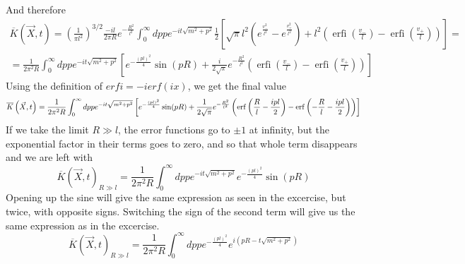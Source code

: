 \documentclass{article}
\DeclareMathOperator{\erfi}{erfi}
\begin{document}
And therefore
\begin{equation}
\begin{gathered}
    \overline{K}\left(\vec{X}, t\right)
    = \left(\frac{1}{\pi l^2}\right)^{3/2} \frac{-il}{2\pi R}
    e^{-\frac{R^2}{l^2}}
    \int_{0}^{\infty} dp p e^{-it\sqrt{m^2 + p^2}}
    \frac{1}{2}\left[
        \sqrt{\pi}l^2\left(e^\frac{v_{-}^2}{l^2} - e^\frac{v_{+}^2}{l^2}\right) +
        l^2 \left(\erfi\left(\frac{v_{-}}{l}\right) - \erfi\left(\frac{v_{+}}{l}\right)\right)
    \right] = \\
    = \frac{1}{2\pi^2 R}
    \int_{0}^{\infty} dp p e^{-it\sqrt{m^2 + p^2}}
    \left[
        e^{-\frac{(pl)^2}{4}}\sin(pR) +
        \frac{i}{2 \sqrt{\pi}} e^{-\frac{R^2}{l^2}} \left(\erfi\left(\frac{v_{-}}{l}\right) - \erfi\left(\frac{v_{+}}{l}\right)\right)
    \right]
\end{gathered}
\end{equation}
Using the definition of $erfi = -ierf(ix)$, we get the final value
\begin{equation}
    \overline{K}\left(\vec{X}, t\right)
    = \frac{1}{2\pi^2 R}
    \int_{0}^{\infty} dp p e^{-it\sqrt{m^2 + p^2}}
    \left[
        e^{-\frac{(pl)^2}{4}}\sin(pR) +
        \frac{1}{2 \sqrt{\pi}} e^{-\frac{R^2}{l^2}}
        \left(\erf\left(\frac{R}{l} - \frac{ipl}{2}\right) - \erf\left(-\frac{R}{l} - \frac{ipl}{2}\right)\right)
    \right]
\end{equation}
If we take the limit $R \gg l$, the error functions go to $\pm 1$ at infinity, but the exponential factor in their terms goes to zero, and so that whole term disappears and we are left with
\begin{equation}
    \overline{K}\left(\vec{X}, t\right)_{R \gg l}
    = \frac{1}{2\pi^2 R}
    \int_{0}^{\infty} dp p e^{-it\sqrt{m^2 + p^2}} e^{-\frac{(pl)^2}{4}}\sin(pR)
\end{equation}
Opening up the sine will give the same expression as seen in the excercise, but twice, with opposite signs. Switching the sign of the second term will give us the same expression as in the excercise.
\begin{equation}
    \overline{K}\left(\vec{X}, t\right)_{R \gg l}
    = \frac{1}{2\pi^2 R}
    \int_{0}^{\infty} dp p e^{-\frac{(pl)^2}{4}} e^{i\left(pR - t\sqrt{m^2 + p^2}\right)}
\end{equation}
\end{document}
